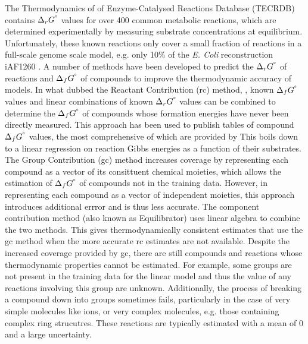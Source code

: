 \documentclass[10pt,letterpaper]{article}
\newcommand{\sdgf}{\Delta_fG^{\degree}}
\newcommand{\sdgr}{\Delta_rG^{\degree}}
\begin{document}
The Thermodynamics of of Enzyme-Catalysed Reactions Database (TECRDB) \cite{tecrdb} contains $\sdgr$ values for over 400 common metabolic reactions, which are determined experimentally by measuring substrate concentrations at equilibrium. %
Unfortunately, these known reactions only cover a small fraction of reactions in a full-scale genome scale model, e.g. only 10\% of the \textit{E. Coli} reconstruction iAF1260 \cite{recon_low_coverage}.
A number of methods have been developed to predict the $\sdgr$ of reactions and $\sdgf$ of compounds to improve the thermodynamic accuracy of models.
In what \citet{noor_2013_equilibrator} dubbed the Reactant Contribution (rc) method, \cite{burton_original_rc}, known $\sdgf$ values and linear combinations of known $\sdgr$ values can be combined to determine the $\sdgf$ of compounds whose formation energies have never been directly measured.
This approach has been used to publish tables of compound $\sdgf$ values, the most comprehensive of which are provided by \cite{alberty_dgf_table}
This boils down to a linear regression on reaction Gibbs energies as a function of their substrates.
The Group Contribution (gc) method \cite{JANKOWSKI_2008_group_contribution, Mavrovouniotis_1990_group_contribtuion} increases coverage by representing each compound as a vector of its consittuent chemical moieties, which allows the estimation of $\sdgf$ of compounds not in the training data.
However, in representing each compound as a vector of independent moieties, this approach introduces additional errror and is thus less accurate.
The component contribution method (also known as Equilibrator) \cite{noor_2013_equilibrator} uses linear algebra to combine the two methods.
This gives thermodynamically consistent estimates that use the gc method when the more accurate rc estimates are not available.
Despite the increased coverage provided by gc, there are still compounds and reactions whose thermodynamic properties cannot be estimated.
For example, some groups are not present in the training data for the linear model and thus the value of any reactions involving this group are unknown.
Additionally, the process of breaking a compound down into groups sometimes fails, particularly in the case of very simple molecules like ions, or very complex molecules, e.g. those containing complex ring strucutres.
These reactions are typically estimated with a mean of 0 and a large uncertainty.
\end{document}
